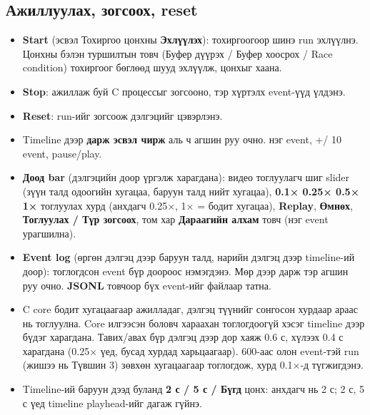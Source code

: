 \documentclass[12pt,a4paper]{article}
\newcommand{\key}[1]{\fbox{\footnotesize\ttfamily #1}}
\begin{document}
\subsection{Ажиллуулах, зогсоох, reset}
\begin{itemize}
  \item \textbf{Start} (эсвэл Тохиргоо цонхны \textbf{Эхлүүлэх}): тохиргоогоор шинэ run эхлүүлнэ. Цонхны бэлэн туршилтын товч (Буфер дүүрэх / Буфер хоосрох / Race condition) тохиргоог бөглөөд шууд эхлүүлж, цонхыг хаана.
  \item \textbf{Stop}: ажиллаж буй C процессыг зогсооно, тэр хүртэлх event-үүд үлдэнэ.
  \item \textbf{Reset}: run-ийг зогсоож дэлгэцийг цэвэрлэнэ.
  \item Timeline дээр \textbf{дарж эсвэл чирж} аль ч агшин руу очно. \key{←} \key{→} нэг event, \key{Shift}+\key{←}/\key{→} 10 event, \key{Space} pause/play.
  \item \textbf{Доод bar} (дэлгэцийн доор үргэлж харагдана): видео тоглуулагч шиг slider (зүүн талд одоогийн хугацаа, баруун талд нийт хугацаа), \textbf{0.1× 0.25× 0.5× 1×} тоглуулах хурд (анхдагч 0.25×, 1× = бодит хугацаа), \textbf{Replay}, \textbf{Өмнөх}, \textbf{Тоглуулах / Түр зогсоох}, том хар \textbf{Дараагийн алхам} товч (нэг event урагшилна).
  \item \textbf{Event log} (өргөн дэлгэц дээр баруун талд, нарийн дэлгэц дээр timeline-ий доор): тоглогдсон event бүр доороос нэмэгдэнэ. Мөр дээр дарж тэр агшин руу очно. \textbf{JSONL} товчоор бүх event-ийг файлаар татна.
  \item C core бодит хугацаагаар ажилладаг, дэлгэц түүнийг сонгосон хурдаар араас нь тоглуулна. Core илгээсэн боловч хараахан тоглогдоогүй хэсэг timeline дээр бүдэг харагдана. Тавих/авах бүр дэлгэц дээр дор хаяж 0.6 с, хүлээх 0.4 с харагдана (0.25× үед, бусад хурдад харьцаагаар). 600-аас олон event-тэй run (жишээ нь Түвшин 3) зөвхөн хугацаагаар тоглогдож, хурд 0.1×-д түгжигдэнэ.
  \item Timeline-ий баруун дээд буланд \textbf{2 с / 5 с / Бүгд} цонх: анхдагч нь 2 с; 2 с, 5 с үед timeline playhead-ийг дагаж гүйнэ.
\end{itemize}
\end{document}
